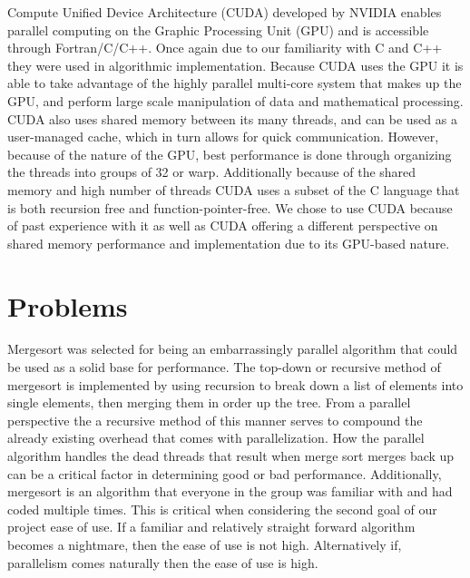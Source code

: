 \documentclass[conference,12pt]{IEEEtran}
\begin{document}
		Compute Unified Device Architecture (CUDA) developed by NVIDIA enables parallel computing on the Graphic Processing Unit (GPU) and is accessible through Fortran/C/C++.  Once again due to our familiarity with C and C++ they were used in algorithmic implementation.  Because
		CUDA uses the GPU it is able to take advantage of the highly parallel multi-core system that makes up the GPU, and perform large scale manipulation of data and mathematical processing. CUDA also uses shared memory between its many threads, and can be used as a user-managed cache,
		which in turn allows for quick communication.  However, because of the nature of the GPU, best performance is done through organizing the threads into groups of 32 or warp.  Additionally because of the shared memory and high number of threads CUDA uses a subset of the C language 
		that is both recursion free and function-pointer-free.  We chose to use CUDA because of past experience with it as well as CUDA offering a different perspective on shared memory performance and implementation due to its GPU-based nature.

\section{Problems}
	Mergesort was selected for being an embarrassingly parallel algorithm that could be used as a solid base for performance.  The top-down or recursive method of mergesort is implemented by using recursion to break down a list of elements into single elements, then merging them 
	in order up the tree.  From a parallel perspective the a recursive method of this manner serves to compound the already existing overhead that comes with parallelization.  How the parallel algorithm handles the dead threads that result when merge sort merges back up can be 
	a critical factor in determining good or bad performance.  Additionally, mergesort is an algorithm that everyone in the group was familiar with and had coded multiple times.  This is critical when considering the second goal of our project ease of use.  If a familiar and relatively
	straight forward algorithm becomes a nightmare, then the ease of use is not high. Alternatively if, parallelism comes naturally then the ease of use is high.
\end{document}
